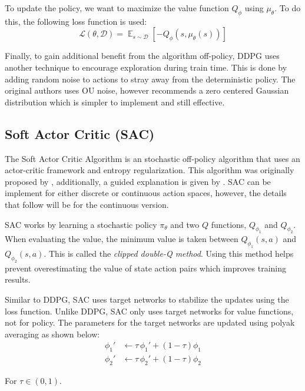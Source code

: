 \documentclass[conference]{IEEEtran}
\begin{document}
To update the policy, we want to maximize the value function $Q_\phi$ using $\mu_\theta$. To do this, the following loss function is used:
$$
    \mathcal{L}(\theta, \mathcal{D}) = \mathop{\mathbb{E}}_{s \sim \mathcal{D}}\left[-Q_\phi(s, \mu_\theta(s))\right]
$$

Finally, to gain additional benefit from the algorithm off-policy, DDPG uses another technique to encourage exploration during train time. This is done by adding random noise to actions to stray away from the deterministic policy. The original authors uses OU noise, however \cite{spinning_up_ddpg} recommends a zero centered Gaussian distribution which is simpler to implement and still effective.

\subsection{Soft Actor Critic (SAC)}

The Soft Actor Critic Algorithm is an stochastic off-policy algorithm that uses an actor-critic framework and entropy regularization. This algorithm was originally proposed by \cite{SAC1, SAC2}, additionally, a guided explanation is given by \cite{spinning_up_sac}. SAC can be implement for either discrete or continuous action spaces, however, the details that follow will be for the continuous version.

SAC works by learning a stochastic policy $\pi_\theta$ and two $Q$ functions, $Q_{\phi_1}$ and $Q_{\phi_2}$.  When evaluating the value, the minimum value is taken between $Q_{\phi_1}(s, a)$ and $Q_{\phi_2}(s, a)$. This is called the \textit{clipped double-Q method}. Using this method helps prevent overestimating the value of state action pairs which improves training results.

Similar to DDPG, SAC uses target networks to stabilize the updates using the loss function. Unlike DDPG, SAC only uses target networks for value functions, not for policy. The parameters for the target networks are updated using polyak averaging as shown below:
\begin{align*}
    \phi_1' & \leftarrow \tau \, \phi_1' + (1 - \tau) \phi_1 \\
    \phi_2' & \leftarrow \tau \, \phi_2' + (1 - \tau) \phi_2
\end{align*}

\begin{flushleft}
    For $\tau \in (0, 1)$.
\end{flushleft}
\end{document}
